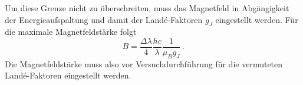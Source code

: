 Um diese Grenze nicht zu überschreiten, muss das Magnetfeld in Abgängigkeit der Energieaufspaltung und damit der Landé-Faktoren $g_J$ eingestellt werden.
Für die maximale Magnetfeldstärke folgt
\begin{equation} \label{eqn:B}
  B = \frac{\Delta \lambda}{4} \frac{h c}{\lambda} \frac{1}{\mu_B g_J} \,.
\end{equation}
Die Magnetfeldstärke muss also vor Versuchdurchführung für die vermuteten Landé-Faktoren eingestellt werden.

